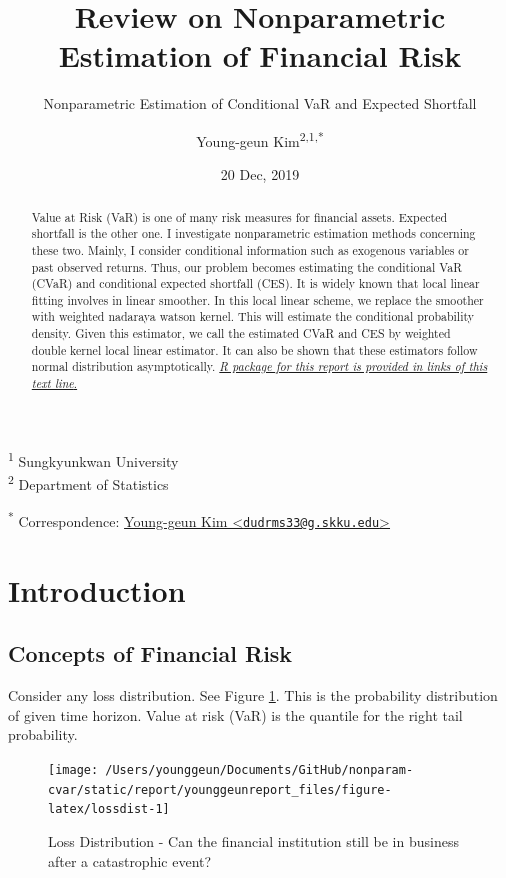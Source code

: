 \documentclass[
]{article}
\title{Review on Nonparametric Estimation of Financial Risk}
\subtitle{Nonparametric Estimation of Conditional VaR and Expected Shortfall}
\author{Young-geun Kim\textsuperscript{2,1,*}}
\date{20 Dec, 2019}
\theoremstyle{definition}
\theoremstyle{definition}
\theoremstyle{definition}
\theoremstyle{remark}
\begin{document}
\maketitle
\begin{abstract}
Value at Risk (VaR) is one of many risk measures for financial assets. Expected shortfall is the other one. I investigate nonparametric estimation methods concerning these two. Mainly, I consider conditional information such as exogenous variables or past observed returns. Thus, our problem becomes estimating the conditional VaR (CVaR) and conditional expected shortfall (CES). It is widely known that local linear fitting involves in linear smoother. In this local linear scheme, we replace the smoother with weighted nadaraya watson kernel. This will estimate the conditional probability density. Given this estimator, we call the estimated CVaR and CES by weighted double kernel local linear estimator. It can also be shown that these estimators follow normal distribution asymptotically. \href{https://github.com/ygeunkim/ceshat}{\emph{R package for this report is provided in links of this text line}.}
\end{abstract}

\textsuperscript{1} Sungkyunkwan University\\
\textsuperscript{2} Department of Statistics

\textsuperscript{*} Correspondence: \href{mailto:dudrms33@g.skku.edu}{Young-geun Kim \textless{}\href{mailto:dudrms33@g.skku.edu}{\nolinkurl{dudrms33@g.skku.edu}}\textgreater{}}

\hypertarget{introduction}{%
\section{Introduction}\label{introduction}}

\hypertarget{concepts-of-financial-risk}{%
\subsection{Concepts of Financial Risk}\label{concepts-of-financial-risk}}

Consider any loss distribution. See Figure \ref{fig:lossdist}. This is the probability distribution of given time horizon. Value at risk (VaR) is the quantile for the right tail probability.

\begin{figure}[H]

{\centering \texttt{[image: /Users/younggeun/Documents/GitHub/nonparam-cvar/static/report/younggeunreport\_files/figure-latex/lossdist-1]} 

}

\caption{Loss Distribution - Can the financial institution still be in business after a catastrophic event?}\label{fig:lossdist}
\end{figure}
\end{document}
